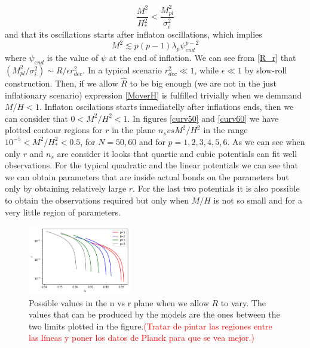 \documentclass[amssymb,twocolumn,prd,nofootinbib,showpacs]{revtex4-1}
\begin{document}
\begin{equation}\label{MoverH}
\frac{M^2}{H^2_*}<\frac{M_{pl}^2}{\sigma_i^2}
\end{equation} 
and that its oscillations starts after inflaton oscillations, which implies
\begin{equation}\label{M2curv}
M^2\lesssim p(p-1)\lambda_p \psi_{end}^{p-2}
\end{equation}
where $\psi_{end}$ is the value of $\psi$ at the end of inflation. We can see from \eqref{R_r} that $(M_{pl}^2/\sigma_i^2)\sim R/\epsilon r_{dec}^2$. In a typical scenario $r_{dec}^2\ll 1$, while $\epsilon\ll 1$ by slow-roll construction. Then, if we allow $\hat R$ to be big enough (we are not in the just inflationary scenario) expression \eqref{MoverH} is fulfilled trivially when we demmand $M/H<1$. Inflaton oscilations starts inmediatelly after inflations ends, then we can consider that $0<M^2/H^2<1$. In figures \ref{curv50} and \ref{curv60} we have plotted contour regions for $r$ in the plane $n_s vs M^2/H^2$ in the range $10^{-5}<M^2/H_*^2<0.5$, for $N=50,60$ and for $p=1,2,3,4,5,6$. As we can see when only $r$ and $n_s$ are consider it looks that quartic and cubic potentials can fit well observations. For the typical quadratic and the linear potentials we can see that we can obtain parameters that are inside actual bonds on the parameters but only by obtaining relatively large $r$. For the last two potentials it is also possible to obtain the observations required but only when $M/H$ is not so small and for a very little region of parameters.   
\begin{figure}
\centering
\includegraphics[width=0.4\textwidth]{nvsr}
\caption{Possible values in the n vs r plane when we allow $R$ to vary. The values that can be produced by the models are the ones between the two limits plotted in the figure.\textcolor{red}{(Tratar de pintar las regiones entre las l\'ineas y poner los datos de Planck para que se vea mejor.)}}
\label{nvsr}
\end{figure}
%
\end{document}
